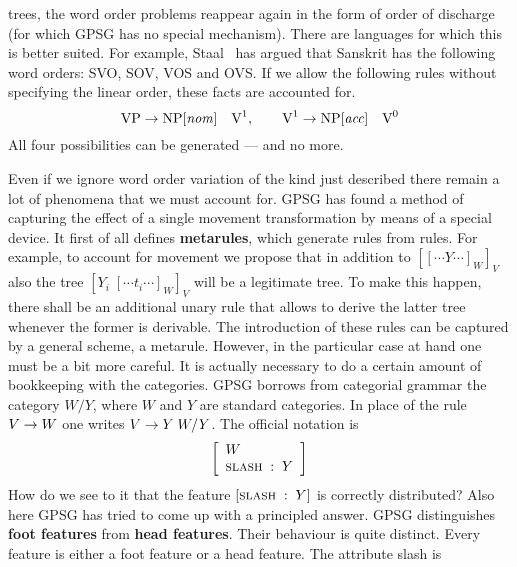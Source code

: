 trees, the word order problems reappear again in the form of order 
of discharge (for which GPSG has no special mechanism). There are 
languages for which this is better suited.
For example, Staal~ 
has argued that Sanskrit
has the following word orders: SVO, SOV, VOS and OVS. If we allow
the following rules without specifying the linear order, these
facts are accounted for.
\begin{equation}
\mbox{\rm VP} \rightarrow \mbox{\rm NP}[\mbox{\it nom\/}]\quad
\mbox{\rm V}^1,
\qquad
\mbox{\rm V}^1 \rightarrow \mbox{\rm NP}[\mbox{\it acc\/}]\quad 
\mbox{\rm V}^0
\end{equation}
All four possibilities can be generated --- and no more.

Even if we ignore word order variation of the kind just described there
remain a lot of phenomena that we must account for. GPSG has
found a method of capturing the effect of a single movement
transformation by means of a special device. It first of all
defines \textbf{metarules},
which generate rules from rules. For example, to account for movement 
we propose that in addition to $[[\dotsb Y\dotsb]_W]_V$ also the 
tree $[Y_i\; [\dotsb t_i\dotsb]_W]_V$ will be a legitimate tree. 
To make this happen, there shall be an additional unary rule that 
allows to derive the latter tree whenever the former is derivable. 
The introduction 
of these rules can be captured by a general scheme, a metarule. 
However, in the particular case at hand one must be a bit more 
careful. It is actually necessary to do a certain amount of bookkeeping 
with the categories. GPSG borrows from categorial grammar the category 
$W/Y$, where $W$ and $Y$ are standard categories. In place of the rule 
$V \rightarrow W$ one writes $V \rightarrow Y\; W/Y$. The official notation is
\begin{equation}
\left[\begin{array}{l}
W \\
\mbox{\sc slash} \; :\;  Y
\end{array}\right]
\end{equation}
How do we see to it that the feature $[\mbox{\sc slash} \; : \; Y]$ is
correctly distributed? Also here GPSG has tried to come up with a
principled answer. GPSG distinguishes \textbf{foot features} from
\textbf{head features}. Their behaviour is quite distinct. Every
feature is either a foot feature or a head feature. The attribute
{\sc slash} is
